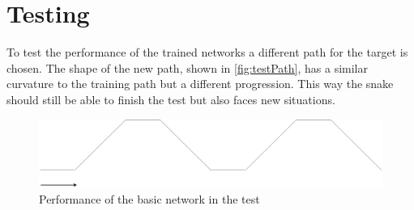 \chapter{Testing}
To test the performance of the trained networks a different path for the target is chosen. The shape of the new path, shown in \autoref{fig:testPath}, has a similar curvature to the training path but a different progression. This way the snake should still be able to finish the test but also faces new situations. 

\begin{figure}[htpb]
  \centering
  \includegraphics[width=\textwidth]{figures/plots/testPath}
  \caption{ Performance of the basic network in the test }
  \label{fig:testPath}
\end{figure}
